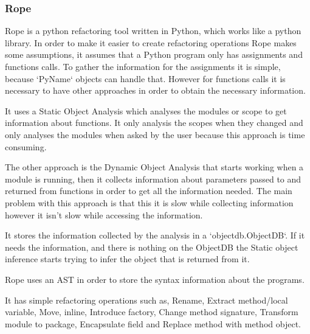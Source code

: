 
\subsubsection{Rope}

Rope is a python refactoring tool written in Python, which works like a python library.
In order to make it easier to create refactoring operations Rope makes some assumptions, it assumes that a Python program only has assignments and functions calls. %
To gather the information for the assignments it is simple, because `PyName` objects can handle that. However for functions calls it is necessary to have other approaches in order to obtain the necessary information. 

It uses a Static Object Analysis which analyses the modules or scope to get information about functions. It only analysis the scopes when they changed and only analyses the modules when asked by the user because this approach is time consuming. 

The other approach is the Dynamic Object Analysis that starts working when a module is running, then it collects information about parameters passed to and returned from functions in order to get all the information needed. The main problem with this approach is that this it is slow while collecting information however it isn't slow while accessing the information.

It stores the information collected by the analysis in a `objectdb.ObjectDB`. If it needs the information, and there is nothing on the ObjectDB the Static object inference starts trying to infer the object that is returned from it.

Rope uses an AST in order to store the syntax information about the programs.

It has simple refactoring operations such as, Rename, Extract method/local variable, Move, inline, Introduce factory, Change method signature, Transform module to package, Encapsulate field and Replace method with method object.





